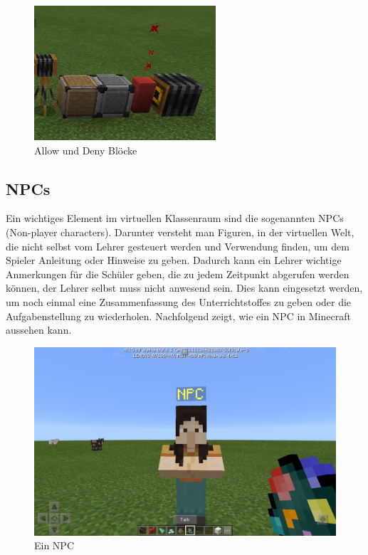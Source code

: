 \begin{figure}[ht]
	\centering
	\includegraphics{images/AllowAndDenyBlocks.png}
	\caption{Allow und Deny Blöcke \cite{GamepediaMinecraft}}
	\label{allowDenyBlocks}
\end{figure}

\subsection{NPCs}
Ein wichtiges Element im virtuellen Klassenraum sind die sogenannten NPCs (Non-player characters).
Darunter versteht man Figuren, in der virtuellen Welt, die nicht selbst vom Lehrer gesteuert werden und Verwendung finden, um dem Spieler Anleitung oder Hinweise zu geben. Dadurch kann ein Lehrer wichtige Anmerkungen für die Schüler geben, die zu jedem Zeitpunkt abgerufen werden können, der Lehrer selbst muss nicht anwesend sein.
Dies kann eingesetzt werden, um noch einmal eine Zusammenfassung des Unterrichtstoffes zu geben oder die Aufgabenstellung zu wiederholen. Nachfolgend zeigt, wie ein NPC in Minecraft aussehen kann.

\begin{figure}[ht]
	\centering
	\includegraphics[width=\textwidth,height=\textheight,keepaspectratio]{images/NPC.png}
	\caption{Ein NPC \cite{GamepediaMinecraft}}
	\label{npc}
\end{figure}

